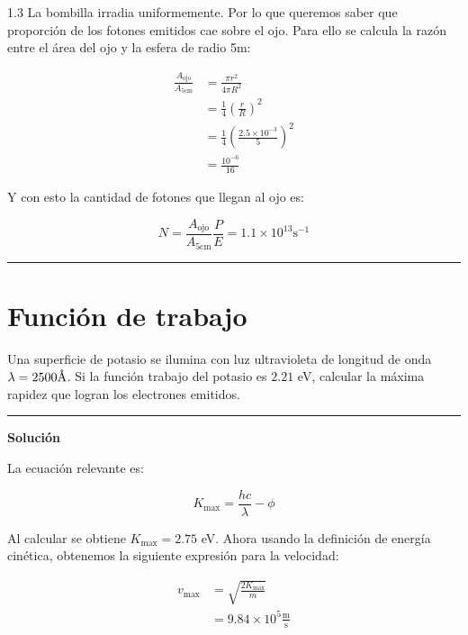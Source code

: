 \documentclass[12pt]{article}
\newcommand{\angstrom}{\mbox{\normalfont\AA}}
\begin{document}
1.3 La bombilla irradia uniformemente. Por lo que queremos saber que proporción de los fotones emitidos cae sobre el ojo. Para ello se calcula la razón entre el área del ojo y la esfera de radio 5m:

\begin{align*}
\frac{A_{\text{ojo}}}{A_{5\text{cm}}} &= \frac{\pi r^2}{4 \pi R^2} \\
&= \frac{1}{4} \left(\frac{r}{R}\right)^2\\
&= \frac{1}{4} \left(\frac{2.5 \times 10^{-3}}{5}\right)^2\\
&= \frac{10^{-6}}{16}
\end{align*}

Y con esto la cantidad de fotones que llegan al ojo es:

\begin{equation*}
N = \frac{A_{\text{ojo}}}{A_{5\text{cm}}} \frac{P}{E} = 1.1 \times 10^{13} \text{s}^{-1}
\end{equation*}

\noindent\rule{16.5cm}{0.4pt}


\section{Función de trabajo}

 Una superficie de potasio se ilumina con luz ultravioleta de longitud de onda $\lambda = 2500  \angstrom $.
Si la función trabajo del potasio es $2.21$ eV, calcular la máxima rapidez que logran los
electrones emitidos.


\noindent\rule{16.5cm}{0.4pt}


\begin{center}
	\textbf{Solución}
\end{center}

La ecuación relevante es:

\begin{equation*}
K_{\text{max}} = \frac{h c}{\lambda} - \phi
\end{equation*}

Al calcular se obtiene $K_{\text{max}} = 2.75 $ eV. Ahora usando la definición de energía cinética, obtenemos la siguiente expresión para la velocidad:


\begin{align*}
v_{\text{max}} &= \sqrt{\frac{2K_{\text{max}}}{m}}\\
&= 9.84 \times 10^5 \frac{\text{m}}{\text{s}}
\end{align*}
\end{document}
